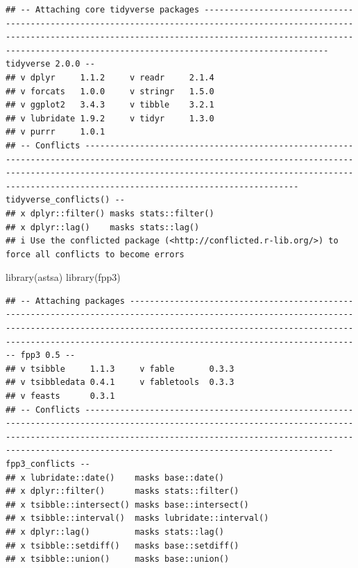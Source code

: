\documentclass[
]{article}
\newenvironment{Shaded}{\begin{snugshade}}{\end{snugshade}}
\newcommand{\FunctionTok}[1]{\textcolor[rgb]{0.00,0.00,0.00}{#1}}
\newcommand{\NormalTok}[1]{#1}
\begin{document}
\begin{verbatim}
## -- Attaching core tidyverse packages ------------------------------------------------------------------------------------------------------------------------------------------------------------------------------------------------------------------------------------------- tidyverse 2.0.0 --
## v dplyr     1.1.2     v readr     2.1.4
## v forcats   1.0.0     v stringr   1.5.0
## v ggplot2   3.4.3     v tibble    3.2.1
## v lubridate 1.9.2     v tidyr     1.3.0
## v purrr     1.0.1     
## -- Conflicts ------------------------------------------------------------------------------------------------------------------------------------------------------------------------------------------------------------------------------------------------------------- tidyverse_conflicts() --
## x dplyr::filter() masks stats::filter()
## x dplyr::lag()    masks stats::lag()
## i Use the conflicted package (<http://conflicted.r-lib.org/>) to force all conflicts to become errors
\end{verbatim}

\begin{Shaded}
\begin{Highlighting}[]
\FunctionTok{library}\NormalTok{(astsa)}
\FunctionTok{library}\NormalTok{(fpp3)}
\end{Highlighting}
\end{Shaded}

\begin{verbatim}
## -- Attaching packages ----------------------------------------------------------------------------------------------------------------------------------------------------------------------------------------------------------------------------------------------------------------- fpp3 0.5 --
## v tsibble     1.1.3     v fable       0.3.3
## v tsibbledata 0.4.1     v fabletools  0.3.3
## v feasts      0.3.1     
## -- Conflicts -------------------------------------------------------------------------------------------------------------------------------------------------------------------------------------------------------------------------------------------------------------------- fpp3_conflicts --
## x lubridate::date()    masks base::date()
## x dplyr::filter()      masks stats::filter()
## x tsibble::intersect() masks base::intersect()
## x tsibble::interval()  masks lubridate::interval()
## x dplyr::lag()         masks stats::lag()
## x tsibble::setdiff()   masks base::setdiff()
## x tsibble::union()     masks base::union()
\end{verbatim}
\end{document}

